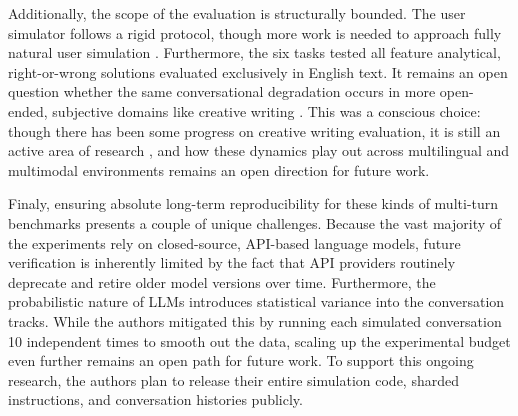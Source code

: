 \documentclass[manuscript,review]{acmart}
\begin{document}
Additionally, the scope of the evaluation is structurally bounded. The user simulator follows a rigid protocol, though more work is needed to approach fully natural user simulation \cite{naous2025towards, dou2025simulating, mehri2025user, ross2025simulating}. Furthermore, the six tasks tested all feature analytical, right-or-wrong solutions evaluated exclusively in English text. It remains an open question whether the same conversational degradation occurs in more open-ended, subjective domains like creative writing \cite{chakrabarty2024creativity}. This was a conscious choice: though there has been some progress on creative writing evaluation, it is still an active area of research \cite{chakrabarty2025advancements}, and how these dynamics play out across multilingual and multimodal environments remains an open direction for future work.

Finaly, ensuring absolute long-term reproducibility for these kinds of multi-turn benchmarks presents a couple of unique challenges. Because the vast majority of the experiments rely on closed-source, API-based language models, future verification is inherently limited by the fact that API providers routinely deprecate and retire older model versions over time. Furthermore, the probabilistic nature of LLMs introduces statistical variance into the conversation tracks. While the authors mitigated this by running each simulated conversation 10 independent times to smooth out the data, scaling up the experimental budget even further remains an open path for future work. To support this ongoing research, the authors plan to release their entire simulation code, sharded instructions, and conversation histories publicly.



\end{document}
